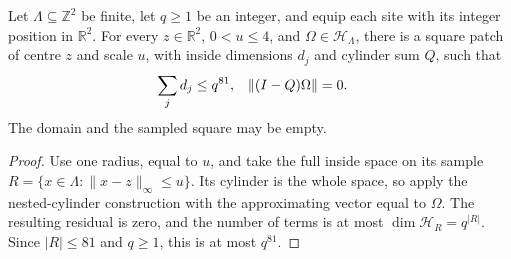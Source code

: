 \begin{theorem}
    \label{thm:peps_bounded_radius_square_patch}
    Let $\Lambda\subseteq\mathbb Z^2$ be finite, let $q\geq1$ be an integer,
    and equip each site with its integer position in $\mathbb R^2$.
    For every $z\in\mathbb R^2$, $0<u\leq4$, and
    $\Omega\in\mathcal H_\Lambda$, there is a square patch of centre $z$
    and scale $u$, with inside dimensions $d_j$ and cylinder sum $Q$, such that
    \begin{align}
        \sum_j d_j & \leq q^{81}, & \|(I-Q)\Omega\| & =0. \notag
    \end{align}
    The domain and the sampled square may be empty.
\end{theorem}
\begin{proof}
    Use one radius, equal to $u$, and take the full inside space on its sample
    $R=\{x\in\Lambda:\|x-z\|_\infty\leq u\}$.
    Its cylinder is the whole space, so apply the nested-cylinder construction
    with the approximating vector equal to $\Omega$.
    The resulting residual is zero, and the number of terms is at most
    $\dim\mathcal H_R=q^{|R|}$.
    Since $|R|\leq81$ and $q\geq1$, this is at most $q^{81}$.
\end{proof}
